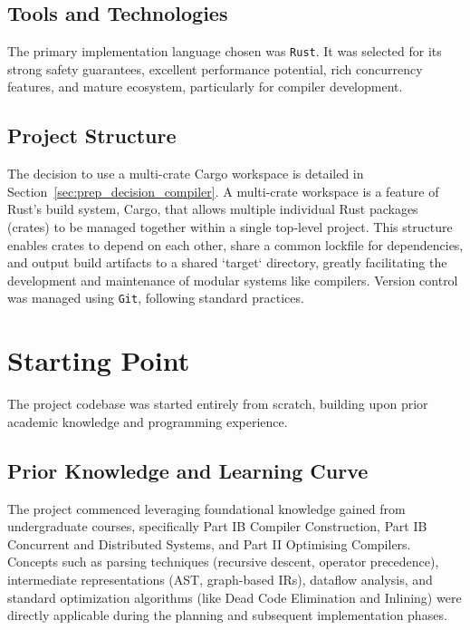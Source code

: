 \subsection{Tools and Technologies}
The primary implementation language chosen was \texttt{Rust}. It was selected for its strong safety guarantees, excellent performance potential, rich concurrency features, and mature ecosystem, particularly for compiler development.

\subsection{Project Structure}\label{sec:prep_project_structure}
The decision to use a multi-crate Cargo workspace is detailed in Section~\ref{sec:prep_decision_compiler}. A multi-crate workspace is a feature of Rust's build system, Cargo, that allows multiple individual Rust packages (crates) to be managed together within a single top-level project. This structure enables crates to depend on each other, share a common lockfile for dependencies, and output build artifacts to a shared `target` directory, greatly facilitating the development and maintenance of modular systems like compilers. Version control was managed using \texttt{Git}, following standard practices.

\section{Starting Point}\label{sec:prep_starting_point} %
The project codebase was started entirely from scratch, building upon prior academic knowledge and programming experience.

\subsection{Prior Knowledge and Learning Curve}
The project commenced leveraging foundational knowledge gained from undergraduate courses, specifically Part IB Compiler Construction, Part IB Concurrent and Distributed Systems, and Part II Optimising Compilers. Concepts such as parsing techniques (recursive descent, operator precedence), intermediate representations (AST, graph-based IRs), dataflow analysis, and standard optimization algorithms (like Dead Code Elimination and Inlining) were directly applicable during the planning and subsequent implementation phases.

